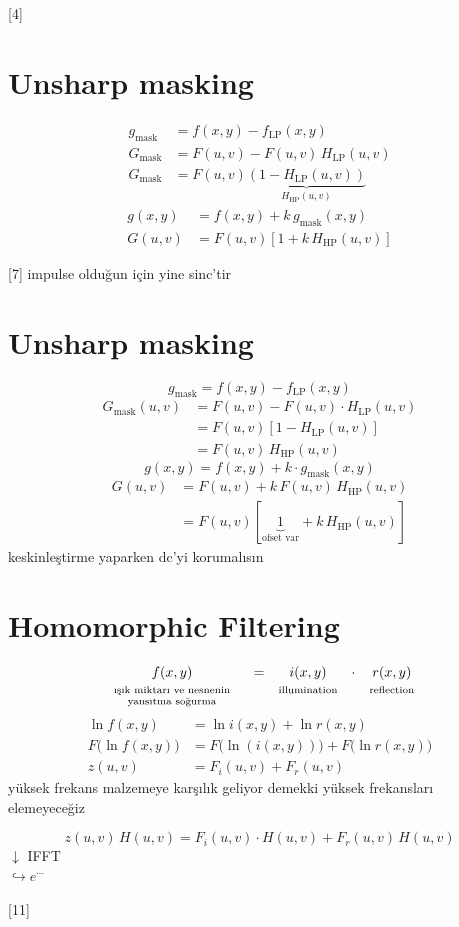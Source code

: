 \documentclass[11pt,a4paper]{article}
\begin{document}
[4]

\section{Unsharp masking}
\begin{align*}
g_{\mathrm{mask}} &= f(x,y)-f_{\mathrm{LP}}(x,y)\\
G_{\mathrm{mask}} &= F(u,v)-F(u,v)\,H_{\mathrm{LP}}(u,v)\\
G_{\mathrm{mask}} &= F(u,v)\underbrace{\left(1-H_{\mathrm{LP}}(u,v)\right)}_{H_{\mathrm{HP}}(u,v)}
\end{align*}
\begin{align*}
g(x,y) &= f(x,y)+k\,g_{\mathrm{mask}}(x,y)\\
G(u,v) &= F(u,v)\left[1+k\,H_{\mathrm{HP}}(u,v)\right]
\end{align*}

[7]
impulse olduğun için yine sinc'tir

\section{Unsharp masking}
\[ g_{\mathrm{mask}}=f(x,y)-f_{\mathrm{LP}}(x,y) \]
\begin{align*}
G_{\mathrm{mask}}(u,v) &= F(u,v)-F(u,v)\cdot H_{\mathrm{LP}}(u,v)\\
&= F(u,v)\left[1-H_{\mathrm{LP}}(u,v)\right]\\
&= F(u,v)\,H_{\mathrm{HP}}(u,v)
\end{align*}
\[ g(x,y)=f(x,y)+k\cdot g_{\mathrm{mask}}(x,y) \]
\begin{align*}
G(u,v) &= F(u,v)+k\,F(u,v)\,H_{\mathrm{HP}}(u,v)\\
&= F(u,v)\left[\underbrace{1}_{\text{ofset var}}+k\,H_{\mathrm{HP}}(u,v)\right]
\end{align*}
keskinleştirme yaparken dc'yi korumalısın

\section{Homomorphic Filtering}
\[
\begin{array}{ccccc}
f(x,y) & = & i(x,y) & \cdot & r(x,y)\\
\parbox[t]{3.4cm}{\centering\scriptsize ışık miktarı ve nesnenin yansıtma soğurma} & & \text{\scriptsize illumination} & & \text{\scriptsize reflection}
\end{array}
\]
\begin{align*}
\ln f(x,y) &= \ln i(x,y)+\ln r(x,y)\\
F\bigl(\ln f(x,y)\bigr) &= F\bigl(\ln(i(x,y))\bigr)+F\bigl(\ln r(x,y)\bigr)\\
z(u,v) &= F_i(u,v)+F_r(u,v)
\end{align*}
yüksek frekans malzemeye karşılık geliyor demekki yüksek frekansları elemeyeceğiz

\[ z(u,v)\,H(u,v)=F_i(u,v)\cdot H(u,v)+F_r(u,v)\,H(u,v) \]
$\downarrow$ IFFT\\
$\hookrightarrow e^{\cdots}$

[11]
\end{document}
